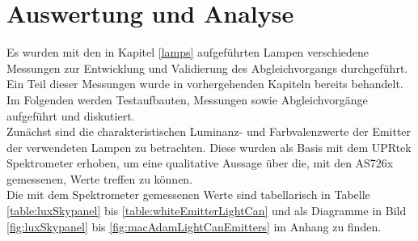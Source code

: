\documentclass[11pt]{scrartcl}
\begin{document}
\section{Auswertung und Analyse}
Es wurden mit den in Kapitel \ref{lamps} aufgeführten Lampen verschiedene Messungen zur Entwicklung und Validierung des Abgleichvorgangs durchgeführt.\\
Ein Teil dieser Messungen wurde in vorhergehenden Kapiteln bereits behandelt. Im Folgenden werden Testaufbauten, Messungen sowie Abgleichvorgänge aufgeführt
und diskutiert.\\
Zunächst sind die charakteristischen Luminanz- und Farbvalenzwerte der Emitter der verwendeten Lampen zu betrachten. Diese wurden als Basis mit dem UPRtek
Spektrometer erhoben, um eine qualitative Aussage über die, mit den AS726x gemessenen, Werte treffen zu können.\\
Die mit dem Spektrometer gemessenen Werte sind tabellarisch in Tabelle \ref{table:luxSkypanel} bis \ref{table:whiteEmitterLightCan} und als Diagramme in
Bild \ref{fig:luxSkypanel} bis \ref{fig:macAdamLightCanEmitters} im Anhang zu finden.
\end{document}
